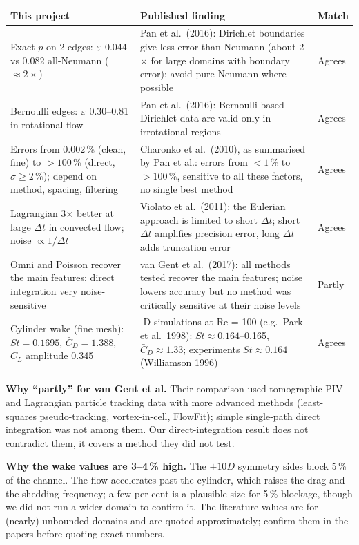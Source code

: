 \begin{table}[H]\centering\small
\begin{tabularx}{\linewidth}{@{}>{\raggedright\arraybackslash}X>{\raggedright\arraybackslash}Xl@{}}\toprule
This project & Published finding & Match\\\midrule
Exact $p$ on 2 edges: $\varepsilon$ 0.044 vs 0.082 all-Neumann ($\approx2\times$) & Pan et al.\ (2016): Dirichlet boundaries give less error than Neumann (about 2$\times$ for large domains with boundary error); avoid pure Neumann where possible & Agrees\\
Bernoulli edges: $\varepsilon$ 0.30--0.81 in rotational flow & Pan et al.\ (2016): Bernoulli-based Dirichlet data are valid only in irrotational regions & Agrees\\
Errors from 0.002\,\% (clean, fine) to $>100$\,\% (direct, $\sigma\ge2\,\%$); depend on method, spacing, filtering & Charonko et al.\ (2010), as summarised by Pan et al.: errors from $<1\,\%$ to $>100\,\%$, sensitive to all these factors, no single best method & Agrees\\
Lagrangian 3$\times$ better at large $\Delta t$ in convected flow; noise $\propto1/\Delta t$ & Violato et al.\ (2011): the Eulerian approach is limited to short $\Delta t$; short $\Delta t$ amplifies precision error, long $\Delta t$ adds truncation error & Agrees\\
Omni and Poisson recover the main features; direct integration very noise-sensitive & van Gent et al.\ (2017): all methods tested recover the main features; noise lowers accuracy but no method was critically sensitive at their noise levels & Partly\\
Cylinder wake (fine mesh): $St=0.1695$, $\bar C_D=1.388$, $C_L$ amplitude 0.345 & 2-D simulations at Re = 100 (e.g.\ Park et al.\ 1998): $St\approx0.164$--0.165, $\bar C_D\approx1.33$; experiments $St\approx0.164$ (Williamson 1996) & Agrees\\\bottomrule
\end{tabularx}\end{table}

\textbf{Why ``partly'' for van Gent et al.} Their comparison used tomographic PIV and Lagrangian particle tracking data with more advanced methods (least-squares pseudo-tracking, vortex-in-cell, FlowFit); simple single-path direct integration was not among them. Our direct-integration result does not contradict them, it covers a method they did not test.

\textbf{Why the wake values are 3--4\,\% high.} The $\pm10D$ symmetry sides block 5\,\% of the channel. The flow accelerates past the cylinder, which raises the drag and the shedding frequency; a few per cent is a plausible size for 5\,\% blockage, though we did not run a wider domain to confirm it. The literature values are for (nearly) unbounded domains and are quoted approximately; confirm them in the papers before quoting exact numbers.

